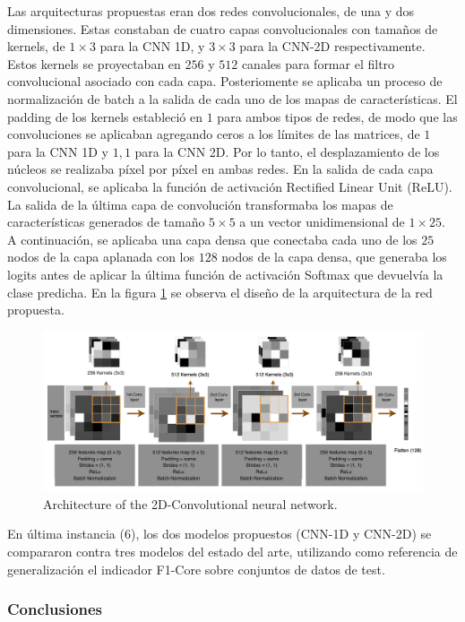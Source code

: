 \documentclass{uathesis-es}
\begin{document}
{	Las arquitecturas propuestas eran dos redes convolucionales, de una y dos dimensiones. Estas constaban de cuatro capas convolucionales con tamaños de kernels, de $1 \times 3$ para la CNN 1D, y $3 \times 3$ para la CNN-2D respectivamente. Estos kernels se proyectaban en $256$ y $512$ canales para formar el filtro convolucional asociado con cada capa. Posteriomente se aplicaba un proceso de normalización de batch a la salida de cada uno de los mapas de características. El padding de los kernels estableció en $1$ para ambos tipos de redes, de modo que las convoluciones se aplicaban agregando ceros a los límites de las matrices, de $1$ para la CNN 1D y ${1, 1}$ para la CNN 2D. Por lo tanto, el desplazamiento de los núcleos se realizaba píxel por píxel en ambas redes. En la salida de cada capa convolucional, se aplicaba la función de activación Rectified Linear Unit  (ReLU). La salida de la última capa de convolución transformaba los mapas de características generados de tamaño $5 \times 5$ a un vector unidimensional de $1 \times 25$. A continuación, se aplicaba una capa densa que conectaba cada uno de los $25$ nodos de la capa aplanada con los $128$ nodos de la capa densa, que generaba los logits antes de aplicar la última función de activación Softmax que devuelvía la clase predicha. En la figura \ref{TASPCNNIMAGE} se observa el diseño de la arquitectura de la red propuesta.
	
	\begin{figure}[H]
		\centering
		\includegraphics[width=16cm]{Figures/1stPaper/TASPCNN.png}
		\caption{Architecture of the 2D-Convolutional neural network.}
		\label{TASPCNNIMAGE}
	\end{figure}
	
	En última instancia (6), los dos modelos propuestos (CNN-1D y CNN-2D) se compararon contra tres modelos del estado del arte, utilizando como referencia de generalización el indicador F1-Core sobre conjuntos de datos de test.
	
	
	\subsubsection*{Conclusiones}
	
}
\end{document}
